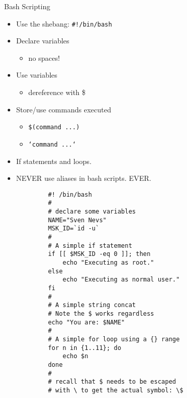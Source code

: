 \begin{frame}[fragile]{Bash Scripting}
  \hspace*{-5ex}
  \begin{minipage}[t]{\textwidth}
      \begin{minipage}[t]{.48\textwidth}
        \begin{itemize}[<+- | alert@+>]
          \item Use the shebang: \texttt{\#!/bin/bash}
          \item Declare variables
          \begin{itemize}[<+- | alert@+>]
            \item no spaces!
          \end{itemize}
          \item Use variables
          \begin{itemize}[<+- | alert@+>]
            \item dereference with \$
          \end{itemize}
          \item Store/use commands executed
          \begin{itemize}[<+- | alert@+>]
            \item \texttt{\$(command ...)}
            \item \texttt{`command ...`}
          \end{itemize}
          \item If statements and loops.
          \item NEVER use aliases in bash scripts. EVER.
        \end{itemize}
      \end{minipage}
      \hfill
      \begin{minipage}[t]{.5\textwidth}
        \begin{center}
          \begin{verbatim}
            #! /bin/bash
            #
            # declare some variables
            NAME="Sven Nevs"
            MSK_ID=`id -u`
            #
            # A simple if statement
            if [[ $MSK_ID -eq 0 ]]; then
                echo "Executing as root."
            else
                echo "Executing as normal user."
            fi
            #
            # A simple string concat
            # Note the $ works regardless
            echo "You are: $NAME"
            #
            # A simple for loop using a {} range
            for n in {1..11}; do
                echo $n
            done
            #
            # recall that $ needs to be escaped
            # with \ to get the actual symbol: \$
          \end{verbatim}
        \end{center}
      \end{minipage}
  \end{minipage}
\end{frame}


